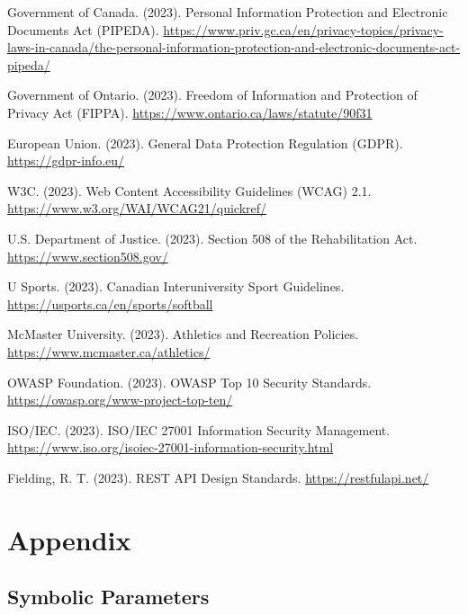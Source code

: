 \documentclass[12pt, titlepage]{article}
\begin{document}
\begin{thebibliography}{9}
 Government of Canada. (2023). Personal Information Protection and Electronic Documents Act (PIPEDA). \url{https://www.priv.gc.ca/en/privacy-topics/privacy-laws-in-canada/the-personal-information-protection-and-electronic-documents-act-pipeda/}

 Government of Ontario. (2023). Freedom of Information and Protection of Privacy Act (FIPPA). \url{https://www.ontario.ca/laws/statute/90f31}

 European Union. (2023). General Data Protection Regulation (GDPR). \url{https://gdpr-info.eu/}

 W3C. (2023). Web Content Accessibility Guidelines (WCAG) 2.1. \url{https://www.w3.org/WAI/WCAG21/quickref/}

 U.S. Department of Justice. (2023). Section 508 of the Rehabilitation Act. \url{https://www.section508.gov/}

 U Sports. (2023). Canadian Interuniversity Sport Guidelines. \url{https://usports.ca/en/sports/softball}

 McMaster University. (2023). Athletics and Recreation Policies. \url{https://www.mcmaster.ca/athletics/}

 OWASP Foundation. (2023). OWASP Top 10 Security Standards. \url{https://owasp.org/www-project-top-ten/}

 ISO/IEC. (2023). ISO/IEC 27001 Information Security Management. \url{https://www.iso.org/isoiec-27001-information-security.html}

 Fielding, R. T. (2023). REST API Design Standards. \url{https://restfulapi.net/}
\end{thebibliography}

\section{Appendix}

\subsection{Symbolic Parameters}
\end{document}
